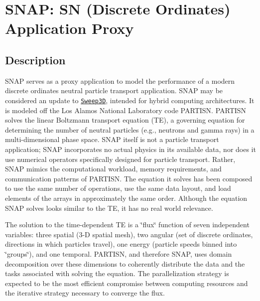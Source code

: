 \section*{S\-N\-A\-P\-: S\-N (Discrete Ordinates) Application Proxy}

\subsection*{Description}

S\-N\-A\-P serves as a proxy application to model the performance of a modern discrete ordinates neutral particle transport application. S\-N\-A\-P may be considered an update to \href{http://www.ccs3.lanl.gov/PAL/software.shtml}{\tt Sweep3\-D}, intended for hybrid computing architectures. It is modeled off the Los Alamos National Laboratory code P\-A\-R\-T\-I\-S\-N. P\-A\-R\-T\-I\-S\-N solves the linear Boltzmann transport equation (T\-E), a governing equation for determining the number of neutral particles (e.\-g., neutrons and gamma rays) in a multi-\/dimensional phase space. S\-N\-A\-P itself is not a particle transport application; S\-N\-A\-P incorporates no actual physics in its available data, nor does it use numerical operators specifically designed for particle transport. Rather, S\-N\-A\-P mimics the computational workload, memory requirements, and communication patterns of P\-A\-R\-T\-I\-S\-N. The equation it solves has been composed to use the same number of operations, use the same data layout, and load elements of the arrays in approximately the same order. Although the equation S\-N\-A\-P solves looks similar to the T\-E, it has no real world relevance.

The solution to the time-\/dependent T\-E is a \char`\"{}flux\char`\"{} function of seven independent variables\-: three spatial (3-\/\-D spatial mesh), two angular (set of discrete ordinates, directions in which particles travel), one energy (particle speeds binned into \char`\"{}groups\char`\"{}), and one temporal. P\-A\-R\-T\-I\-S\-N, and therefore S\-N\-A\-P, uses domain decomposition over these dimensions to coherently distribute the data and the tasks associated with solving the equation. The parallelization strategy is expected to be the most efficient compromise between computing resources and the iterative strategy necessary to converge the flux.

